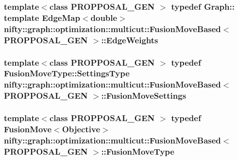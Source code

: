\subsubsection[{Edge\+Weights}]{\setlength{\rightskip}{0pt plus 5cm}template$<$class P\+R\+O\+P\+P\+O\+S\+A\+L\+\_\+\+G\+E\+N $>$ typedef Graph\+:: template Edge\+Map$<$double$>$ {\bf nifty\+::graph\+::optimization\+::multicut\+::\+Fusion\+Move\+Based}$<$ P\+R\+O\+P\+P\+O\+S\+A\+L\+\_\+\+G\+E\+N $>$\+::{\bf Edge\+Weights}}\label{classnifty_1_1graph_1_1optimization_1_1multicut_1_1FusionMoveBased_a17407f5e0b37f72271d8a55bf81bb773}
\hypertarget{classnifty_1_1graph_1_1optimization_1_1multicut_1_1FusionMoveBased_ac1bec62db9428b7d0b46525784e56330}{}
\subsubsection[{Fusion\+Move\+Settings}]{\setlength{\rightskip}{0pt plus 5cm}template$<$class P\+R\+O\+P\+P\+O\+S\+A\+L\+\_\+\+G\+E\+N $>$ typedef {\bf Fusion\+Move\+Type\+::\+Settings\+Type} {\bf nifty\+::graph\+::optimization\+::multicut\+::\+Fusion\+Move\+Based}$<$ P\+R\+O\+P\+P\+O\+S\+A\+L\+\_\+\+G\+E\+N $>$\+::{\bf Fusion\+Move\+Settings}}\label{classnifty_1_1graph_1_1optimization_1_1multicut_1_1FusionMoveBased_ac1bec62db9428b7d0b46525784e56330}
\hypertarget{classnifty_1_1graph_1_1optimization_1_1multicut_1_1FusionMoveBased_a55e358109beb90f244bce5a6aba6f6d7}{}
\subsubsection[{Fusion\+Move\+Type}]{\setlength{\rightskip}{0pt plus 5cm}template$<$class P\+R\+O\+P\+P\+O\+S\+A\+L\+\_\+\+G\+E\+N $>$ typedef {\bf Fusion\+Move}$<${\bf Objective}$>$ {\bf nifty\+::graph\+::optimization\+::multicut\+::\+Fusion\+Move\+Based}$<$ P\+R\+O\+P\+P\+O\+S\+A\+L\+\_\+\+G\+E\+N $>$\+::{\bf Fusion\+Move\+Type}}\label{classnifty_1_1graph_1_1optimization_1_1multicut_1_1FusionMoveBased_a55e358109beb90f244bce5a6aba6f6d7}
\hypertarget{classnifty_1_1graph_1_1optimization_1_1multicut_1_1FusionMoveBased_aa08cbfeb0fe2864bc6c4150d1fe09c7f}{}
